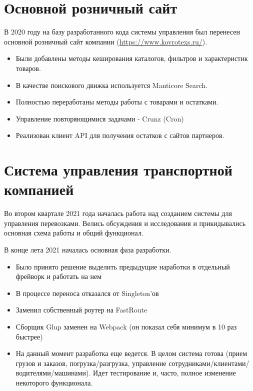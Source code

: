 \documentclass[10pt]{tpl/developercv} %
\begin{document}
\section{Основной розничный сайт}
В 2020 году на базу разработанного кода системы управления был перенесен основной розничный сайт компании (\href{https://www.kovrotexs.ru/}{https://www.kovrotexs.ru/}).

\begin{itemize}
  \item Были добавлены методы кеширования каталогов, фильтров и характеристик товаров.
  \item В качестве поискового движка используется Manticore Search.
  \item Полностью переработаны методы работы с товарами и остатками.
  \item Управление повторяющимися задачами - Crunz (Cron)
  \item Реализован клиент API для получения остатков с сайтов партнеров.
\end{itemize}

\section{Система управления транспортной компанией}
Во втором квартале 2021 года началась работа над созданием системы для управления перевозками. Велись обсуждения и исследования и прикидывались основная схема работы и общий функционал.

В конце лета 2021 началась основная фаза разработки.

\begin{itemize}
  \item Было принято решение выделить предыдущие наработки в отдельный фрейворк и работать на нем
  \item В процессе переноса отказался от Singleton'ов
  \item Заменил собственный роутер на FastRoute
  \item Сборщик Glup заменен на Webpack (он показал себя минимум в 10 раз быстрее)
  \item На данный момент разработка еще ведется. В целом система готова (прием грузов и заказов, погрузка/разгрузка, управление сотрудниками/клиентами/водителями/машинами). Идет тестирование и, часто, полное изменение некоторого функционала.
\end{itemize}

\end{document}
